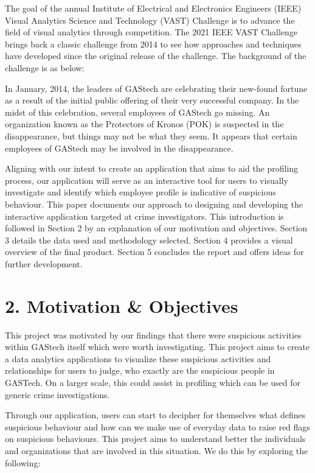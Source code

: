 \documentclass{acm_proc_article-sp}
\begin{document}
The goal of the annual Institute of Electrical and Electronics Engineers (IEEE) Visual Analytics Science and Technology (VAST) Challenge is to advance the field of visual analytics through competition. The 2021 IEEE VAST Challenge brings back a classic challenge from 2014 to see how approaches and techniques have developed since the original release of the challenge. The background of the challenge is as below:

In January, 2014, the leaders of GAStech are celebrating their new-found fortune as a result of the initial public offering of their very successful company. In the midst of this celebration, several employees of GAStech go missing. An organization known as the Protectors of Kronos (POK) is suspected in the disappearance, but things may not be what they seem. It appears that certain employees of GAStech may be involved in the disappearance.

Aligning with our intent to create an application that aims to aid the profiling process, our application will serve as an interactive tool for users to visually investigate and identify which employee profile is indicative of suspicious behaviour. This paper documents our approach to designing and developing the interactive application targeted at crime investigators. This introduction is followed in Section 2 by an explanation of our motivation and objectives. Section 3 details the data used and methodology selected. Section 4 provides a visual overview of the final product. Section 5 concludes the report and offers ideas for further development.

\hypertarget{motivation-objectives}{%
\section{2. Motivation \& Objectives}\label{motivation-objectives}}

This project was motivated by our findings that there were suspicious activities within GAStech itself which were worth investigating. This project aims to create a data analytics applications to visualize these suspicious activities and relationships for users to judge, who exactly are the suspicious people in GASTech. On a larger scale, this could assist in profiling which can be used for generic crime investigations.

Through our application, users can start to decipher for themselves what defines suspicious behaviour and how can we make use of everyday data to raise red flags on suspicious behaviours. This project aims to understand better the individuals and organizations that are involved in this situation. We do this by exploring the following:
\end{document}
